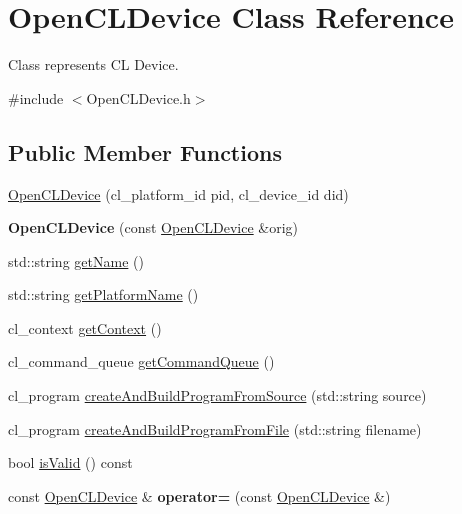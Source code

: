 \hypertarget{class_open_c_l_device}{\section{Open\-C\-L\-Device Class Reference}
\label{class_open_c_l_device}
}


Class represents C\-L Device.  




{\ttfamily \#include $<$Open\-C\-L\-Device.\-h$>$}

\subsection*{Public Member Functions}
\begin{DoxyCompactItemize}
\item 
\hyperlink{class_open_c_l_device_a8d4f5c50944c4745d1ee59b2b717a7d0}{Open\-C\-L\-Device} (cl\-\_\-platform\-\_\-id pid, cl\-\_\-device\-\_\-id did)
\item 
\hypertarget{class_open_c_l_device_a2af0a729c6e471b2189d3cb9acd6a3c4}{{\bfseries Open\-C\-L\-Device} (const \hyperlink{class_open_c_l_device}{Open\-C\-L\-Device} \&orig)}\label{class_open_c_l_device_a2af0a729c6e471b2189d3cb9acd6a3c4}

\item 
std\-::string \hyperlink{class_open_c_l_device_a8e5114c9c63095797470ddefc11f26ca}{get\-Name} ()
\item 
std\-::string \hyperlink{class_open_c_l_device_af1796ace34f0242ee569a5c34bb6034c}{get\-Platform\-Name} ()
\item 
cl\-\_\-context \hyperlink{class_open_c_l_device_a7fac33eb284c2e3a4fc7f93c8cfbf0b7}{get\-Context} ()
\item 
cl\-\_\-command\-\_\-queue \hyperlink{class_open_c_l_device_aff71ddd1dfd95962866ed614b24950d1}{get\-Command\-Queue} ()
\item 
cl\-\_\-program \hyperlink{class_open_c_l_device_a26a7c768342b44584a7d6d5b9ba1bfe6}{create\-And\-Build\-Program\-From\-Source} (std\-::string source)
\item 
cl\-\_\-program \hyperlink{class_open_c_l_device_a687671254390e260d51aa159d55958fd}{create\-And\-Build\-Program\-From\-File} (std\-::string filename)
\item 
bool \hyperlink{class_open_c_l_device_a88adcb0d7cba58d329f752f66868f568}{is\-Valid} () const 
\item 
\hypertarget{class_open_c_l_device_a66585eb3efeae9845d64f5485f6a34a1}{const \hyperlink{class_open_c_l_device}{Open\-C\-L\-Device} \& {\bfseries operator=} (const \hyperlink{class_open_c_l_device}{Open\-C\-L\-Device} \&)}\label{class_open_c_l_device_a66585eb3efeae9845d64f5485f6a34a1}

\end{DoxyCompactItemize}
